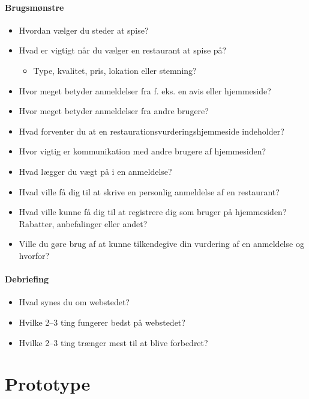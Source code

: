 \documentclass[a4paper, 12pt]{article}
\begin{document}
\paragraph{Brugsmønstre}
\begin{itemize}
\item Hvordan vælger du steder at spise?
\item Hvad er vigtigt når du vælger en restaurant at spise på?
  \begin{itemize}
  \item Type, kvalitet, pris, lokation eller stemning?
  \end{itemize}
\item Hvor meget betyder anmeldelser fra f. eks. en avis eller hjemmeside?
\item Hvor meget betyder anmeldelser fra andre brugere?
\item Hvad forventer du at en restaurationsvurderingshjemmeside indeholder?
\item Hvor vigtig er kommunikation med andre brugere af hjemmesiden?
\item Hvad lægger du vægt på i en anmeldelse?
\item Hvad ville få dig til at skrive en personlig anmeldelse af en restaurant?
\item Hvad ville kunne få dig til at registrere dig som bruger på hjemmesiden?
Rabatter, anbefalinger eller andet?
\item Ville du gøre brug af at kunne tilkendegive din vurdering af en anmeldelse
og hvorfor?
\end{itemize}

\paragraph{Debriefing}
\begin{itemize}
\item Hvad synes du om webstedet?
\item Hvilke 2--3 ting fungerer bedst på webstedet?
\item Hvilke 2--3 ting trænger mest til at blive forbedret?
\end{itemize}

\section{Prototype}
\end{document}
